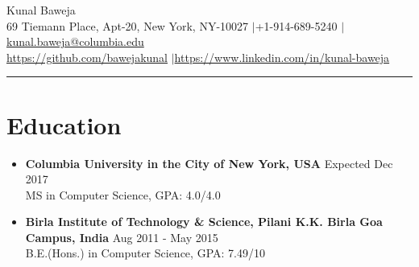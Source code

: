 \documentclass{article}
\def\name{Kunal Baweja}
\begin{document}
\begin{center}
{\huge \name}\\
69 Tiemann Place, Apt-20, New York, NY-10027 $|$\hspace{3pt}+1-914-689-5240 $|$\hspace{3pt}\href{mailto:kunal.baweja@columbia.edu}{kunal.baweja@columbia.edu}\\
\vspace{2pt}
\href{https://github.com/bawejakunal}{https://github.com/bawejakunal} $|$\hspace{3pt}\href{https://www.linkedin.com/in/kunal-baweja}{https://www.linkedin.com/in/kunal-baweja}
\end{center}

\hrule
\vspace{5pt}

\section*{Education}
\begin{itemize}

    \item \textbf{Columbia University in the City of New York, USA} {\hfill Expected Dec 2017}\\
    MS in Computer Science, GPA: 4.0/4.0
    
    \item \textbf{Birla Institute of Technology \& Science, Pilani K.K. Birla Goa Campus, India} {\hfill Aug 2011 - May 2015}\\
    B.E.(Hons.) in Computer Science, GPA: 7.49/10

\end{itemize}
\end{document}
